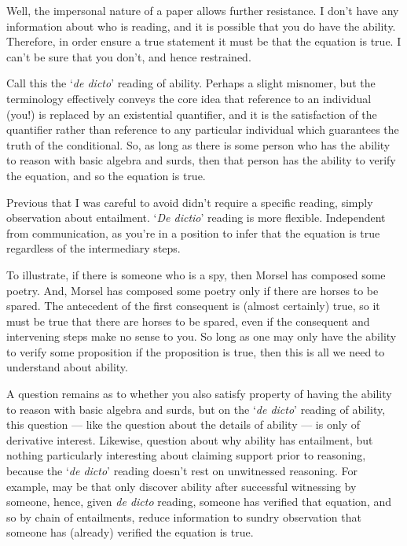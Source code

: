 \begin{note}[Difficulty]
  Well, the impersonal nature of a paper allows further resistance.
  I don't have any information about who is reading, and it is possible that you do have the ability.
  Therefore, in order ensure a true statement it must be that the equation is true.
  I can't be sure that you don't, and hence restrained.
\end{note}

\begin{note}
  Call this the `\emph{de dicto}' reading of ability.
  Perhaps a slight misnomer, but the terminology effectively conveys the core idea that reference to an individual (you!) is replaced by an existential quantifier, and it is the satisfaction of the quantifier rather than reference to any particular individual which guarantees the truth of the conditional.
  So, as long as there is some person who has the ability to reason with basic algebra and surds, then that person has the ability to verify the equation, and so the equation is true.

  Previous that I was careful to avoid didn't require a specific reading, simply observation about entailment.
  `\emph{De dictio}' reading is more flexible.
  Independent from communication, as you're in a position to infer that the equation is true regardless of the intermediary steps.

  To illustrate, if there is someone who is a spy, then Morsel has composed some poetry.
  And, Morsel has composed some poetry only if there are horses to be spared.
  The antecedent of the first consequent is (almost certainly) true, so it must be true that there are horses to be spared, even if the consequent and intervening steps make no sense to you.
  So long as one may only have the ability to verify some proposition if the proposition is true, then this is all we need to understand about ability.

  A question remains as to whether you also satisfy property of having the ability to reason with basic algebra and surds, but on the `\emph{de dicto}' reading of ability, this question --- like the question about the details of ability --- is only of derivative interest.
  Likewise, question about why ability has entailment, but nothing particularly interesting about claiming support prior to reasoning, because the `\emph{de dicto}' reading doesn't rest on unwitnessed reasoning.
  For example, may be that only discover ability after successful witnessing by someone, hence, given \emph{de dicto} reading, someone has verified that equation, and so by chain of entailments, reduce information to sundry observation that someone has (already) verified the equation is true.


\end{note}
